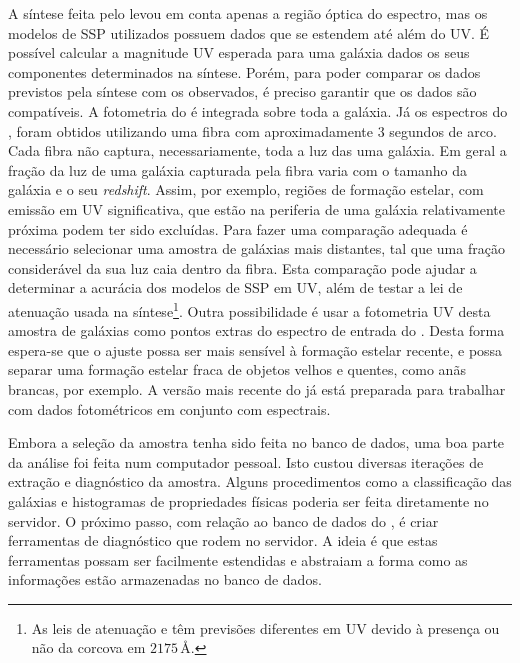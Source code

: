 A síntese feita pelo \starlight levou em conta apenas a região óptica do
espectro, mas os modelos de SSP utilizados possuem dados que se estendem até
além do UV. É possível calcular a magnitude UV esperada para uma galáxia dados
os seus componentes determinados na síntese. Porém, para poder comparar os dados
previstos pela síntese com os observados, é preciso garantir que os dados são
compatíveis. A fotometria do \galex é integrada sobre toda a galáxia. Já os
espectros do \SDSS, foram obtidos utilizando uma fibra com aproximadamente $3$
segundos de arco. Cada fibra não captura, necessariamente, toda a luz das uma
galáxia. Em geral a fração da luz de uma galáxia capturada pela fibra varia com
o tamanho da galáxia e o seu {\em redshift}. Assim, por exemplo, regiões de
formação estelar, com emissão em UV significativa, que estão na periferia de uma
galáxia relativamente próxima podem ter sido excluídas. Para fazer uma
comparação adequada é necessário selecionar uma amostra de galáxias mais
distantes, tal que uma fração considerável da sua luz caia dentro da fibra. Esta
comparação pode ajudar a determinar a acurácia dos modelos de SSP em UV, além de
testar a lei de atenuação usada na síntese\footnote{As leis de atenuação
\citet*[CCM]{Cardelli1989} e \citet*{Calzetti1994} têm previsões diferentes em
UV devido à presença ou não da corcova em $2175\,\text{\AA}$.}. Outra
possibilidade é usar a fotometria UV desta amostra de galáxias como pontos
extras do espectro de entrada do \starlight. Desta forma espera-se que o ajuste
possa ser mais sensível à formação estelar recente, e possa separar uma formação
estelar fraca de objetos velhos e quentes, como anãs brancas, por exemplo. A
versão mais recente do \starlight já está preparada para trabalhar com dados
fotométricos em conjunto com espectrais.

Embora a seleção da amostra tenha sido feita no banco de dados, uma boa parte da
análise foi feita num computador pessoal. Isto custou diversas iterações de
extração e diagnóstico da amostra. Alguns procedimentos como a classificação das
galáxias e histogramas de propriedades físicas poderia ser feita diretamente no
servidor. O próximo passo, com relação ao banco de dados do \starlight, é criar
ferramentas de diagnóstico que rodem no servidor. A ideia é que estas
ferramentas possam ser facilmente estendidas e abstraiam a forma como as
informações estão armazenadas no banco de dados.

